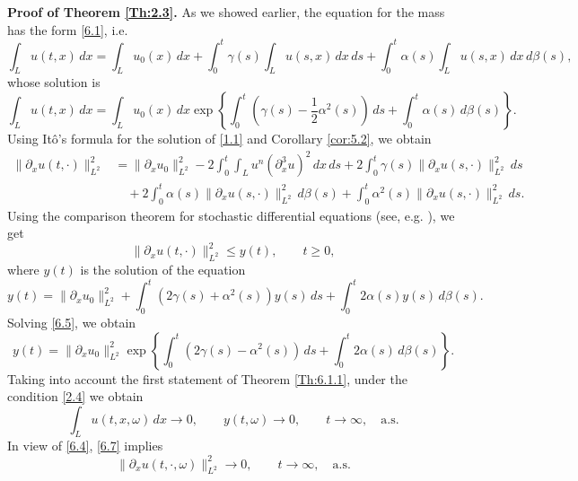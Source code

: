 \documentclass[a4paper,12pt]{article}
\numberwithin{equation}{section}
\def\d{\partial}
\begin{document}
\noindent
\textbf{Proof of Theorem \ref{Th:2.3}.} As we showed earlier, the equation for the mass has the form \eqref{6.1}, i.e. 
\begin{equation}\label{mass}
\int_L u(t,x) \, dx = \int_L u_0(x) \, dx + \int_0^t \gamma(s) \int_L u(s,x)\, dx \, ds + \int_0^t  \alpha(s) \int_L u(s,x)\, dx \, d \beta(s),
\end{equation}
whose solution is 
\begin{equation}\label{6.2}
\int_L u(t,x) \, dx = \int_L u_0(x) \, dx \exp\left\{
\int_0^t \left(\gamma(s)-\frac12\alpha^2(s)\right)\,ds
+ \int_0^t \alpha(s)\,d\beta(s)
\right\}.
\end{equation}
Using It\^o's formula for the solution of \eqref{1.1} and Corollary \eqref{cor:5.2}, we obtain
\begin{align}\label{6.3}
\|\d_x u(t, \cdot)\|_{L^2}^2
&= \|\d_x u_0\|_{L^2}^2
- 2 \int_0^t \int_L u^n (\d_x^3 u)^2 \, dx \,ds
+ 2 \int_0^t \gamma(s) \|\d_x u(s, \cdot)\|_{L^2}^2\,ds  \nonumber \\
&\quad + 2 \int_0^t \alpha(s)\|\d_x u(s, \cdot)\|_{L^2}^2\,d\beta(s)
+ \int_0^t \alpha^2(s)\|\d_x u(s, \cdot)\|_{L^2}^2\,ds .
\end{align}
Using the comparison theorem for stochastic differential equations (see, e.g. \cite{VI}), we get
\begin{equation}\label{6.4}
\|\d_x u(t, \cdot)\|_{L^2}^2 \le y(t), \qquad t \ge 0,
\end{equation}
where $y(t)$ is the solution of the  equation 
\begin{equation}\label{6.5}
y(t) = \|\d_x u_0\|_{L^2}^2 
+ \int_0^t (2 \gamma(s) + \alpha^2(s))y(s)\,ds
+ \int_0^t 2\alpha(s)y(s)\,d\beta(s).
\end{equation}
Solving \eqref{6.5}, we obtain
\begin{equation*}\label{6.6}
y(t)
= \|\d_x u_0\|_{L^2}^2
\exp\left\{
\int_0^t \left(2 \gamma(s)-\alpha^2(s)\right)\,ds
+\int_0^t 2 \alpha(s)\,d\beta(s)
\right\}.
\end{equation*}
Taking into account the first statement of Theorem \ref{Th:6.1.1}, under the condition \eqref{2.4} we obtain
\begin{equation}
\int_L u(t,x,\omega)\,dx \to 0,
\qquad
y(t,\omega) \to 0,
\qquad t\to\infty,
\quad \text{a.s.}
\label{6.7}
\end{equation}
In view of  \eqref{6.4}, \eqref{6.7} implies
\begin{equation}
\|\d_x u(t, \cdot, \omega)\|_{L^2}^2 \to 0,
\qquad t\to\infty,
\quad \text{a.s.}
\label{6.8}
\end{equation}
\end{document}
